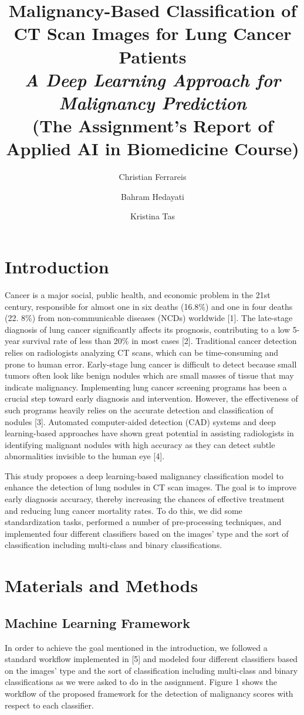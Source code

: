 \documentclass[a4paper, twocolumn, 11pt]{article}
\title{\textbf{Malignancy-Based Classification of CT Scan Images for Lung Cancer Patients}\\
\large \textit{A Deep Learning Approach for Malignancy Prediction}\\
\small (The Assignment's Report of Applied AI in Biomedicine Course)}
\author{Christian Ferrareis}
\affil{\small Student of Computer Science, christian.ferrareis@mail.polimi.it, 10725804}
\author{Bahram Hedayati}
\affil{\small  Student of Telecommunication Engineering, bahram.hedayati@mail.polimi.it, 10870276}
\author{Kristina Tas}
\affil{\small Student of Biomedical Engineering, kristina.tas@mail.polimi.it, 10968804}
\date{}
\begin{document}
\maketitle

\section{Introduction}
Cancer is a major social, public health, and economic problem in the 21st century, responsible for almost one in six deaths (16.8\%) and one in four deaths (22. 8\%) from non-communicable diseases (NCDs) worldwide [1]. The late-stage diagnosis of lung cancer significantly affects its prognosis, contributing to a low 5-year survival rate of less than 20\% in most cases [2]. Traditional cancer detection relies on radiologists analyzing CT scans, which can be time-consuming and prone to human error. Early-stage lung cancer is difficult to detect because small tumors often look like benign nodules which are small masses of tissue that may indicate malignancy. Implementing lung cancer screening programs has been a crucial step toward early diagnosis and intervention. However, the effectiveness of such programs heavily relies on the accurate detection and classification of nodules [3]. Automated computer-aided detection (CAD) systems and deep learning-based approaches have shown great potential in assisting radiologists in identifying malignant nodules with high accuracy as they can detect subtle abnormalities invisible to the human eye [4]. \par
This study proposes a deep learning-based malignancy classification model to enhance the detection of lung nodules in CT scan images. The goal is to improve early diagnosis accuracy, thereby increasing the chances of effective treatment and reducing lung cancer mortality rates. To do this, we did some standardization tasks, performed a number of pre-processing techniques, and implemented four different classifiers based on the images' type and the sort of classification including multi-class and binary classifications. 
\vspace{7pt}

\section{Materials and Methods}

\subsection{Machine Learning Framework}
In order to achieve the goal mentioned in the introduction, we followed a standard workflow implemented in [5] and modeled four different classifiers based on the images' type and the sort of classification including multi-class and binary classifications as we were asked to do in the assignment. Figure 1 shows the workflow of the proposed framework for the detection of malignancy scores with respect to each classifier.
\vspace{7pt}
\end{document}
